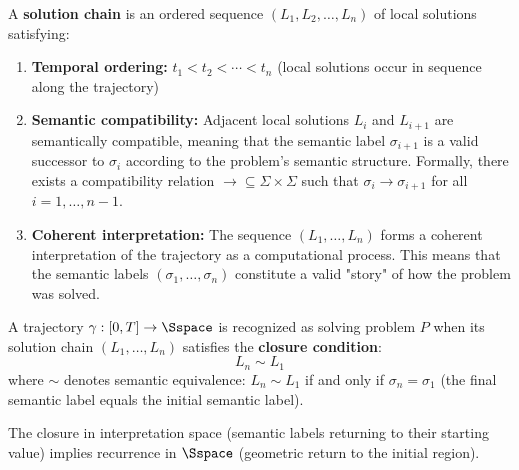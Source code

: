 \begin{definition}
\label{def:solution_chain}
A \textbf{solution chain} is an ordered sequence $(L_1, L_2, \ldots, L_n)$ of local solutions satisfying:
\begin{enumerate}
    \item \textbf{Temporal ordering:} $t_1 < t_2 < \cdots < t_n$ (local solutions occur in sequence along the trajectory)
    
    \item \textbf{Semantic compatibility:} Adjacent local solutions $L_i$ and $L_{i+1}$ are semantically compatible, meaning that the semantic label $\sigma_{i+1}$ is a valid successor to $\sigma_i$ according to the problem's semantic structure. Formally, there exists a compatibility relation $\rightarrow \subseteq \Sigma \times \Sigma$ such that $\sigma_i \rightarrow \sigma_{i+1}$ for all $i = 1, \ldots, n-1$.
    
    \item \textbf{Coherent interpretation:} The sequence $(L_1, \ldots, L_n)$ forms a coherent interpretation of the trajectory as a computational process. This means that the semantic labels $(\sigma_1, \ldots, \sigma_n)$ constitute a valid "story" of how the problem was solved.
\end{enumerate}
\end{definition}

\begin{theorem}
\label{thm:closure_recognition}
A trajectory $\gamma: [0, T] \to \Sspace$ is recognized as solving problem $P$ when its solution chain $(L_1, \ldots, L_n)$ satisfies the \textbf{closure condition}:
\begin{equation}
L_n \sim L_1
\label{eq:closure}
\end{equation}
where $\sim$ denotes semantic equivalence: $L_n \sim L_1$ if and only if $\sigma_n = \sigma_1$ (the final semantic label equals the initial semantic label).

The closure in interpretation space (semantic labels returning to their starting value) implies recurrence in $\Sspace$ (geometric return to the initial region).
\end{theorem}

